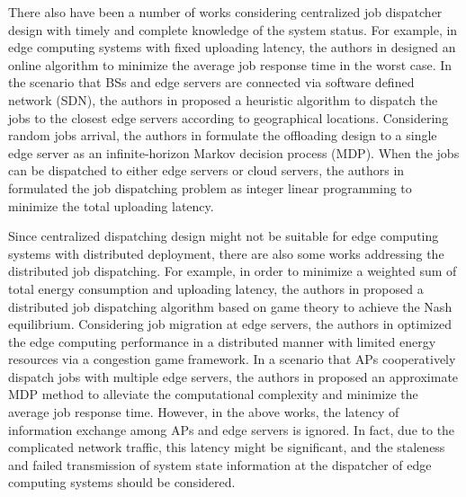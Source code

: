 There also have been a number of works considering centralized job dispatcher design with timely and complete knowledge of the system status.
For example, in edge computing systems with fixed uploading latency, the authors in \cite{tan-online} designed an online algorithm to minimize the average job response time in the worst case.
In the scenario that BSs and edge servers are connected via software defined network (SDN), the authors in \cite{IOTJ18-FanQ} proposed a heuristic algorithm to dispatch the jobs to the closest edge servers according to geographical locations.
Considering random jobs arrival, the authors in \cite{mdp-globecom,mdp-tvt} formulate the offloading design to a single edge server as an infinite-horizon Markov decision process (MDP).
When the jobs can be dispatched to either edge servers or cloud servers, the authors in \cite{MASS18-MengZ} formulated the job dispatching problem as integer linear programming to minimize the total uploading latency.

Since centralized dispatching design might not be suitable for {edge computing systems} with distributed deployment, there are also some works addressing the distributed job dispatching.
For example, in order to minimize a weighted sum of total energy consumption and uploading latency, the authors in \cite{ToN-Xuchen2016} proposed a distributed job dispatching algorithm based on game theory to achieve the Nash equilibrium. 
Considering job migration at edge servers, the authors in \cite{ToN-xujie2018} optimized the edge computing performance in a distributed manner with limited energy resources via a congestion game framework.
In a scenario that APs cooperatively dispatch jobs with multiple edge servers, the authors in \cite{mdp-jcin} proposed {an} approximate MDP method to alleviate the computational complexity and minimize the average job response time.
However, in the above works, the latency of information exchange among APs and edge servers is ignored.
In fact, due to the complicated network traffic, this latency might be significant, and the staleness {and failed transmission} of system state information at the dispatcher of edge computing systems should be considered.

